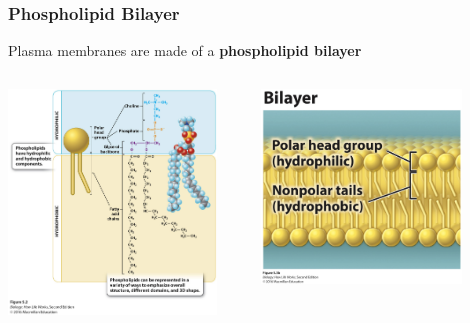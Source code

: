\documentclass[10pt]{beamer}
\begin{document}
\begin{frame}[t]
\frametitle{Phospholipid Bilayer}
\vspace{0.5cm}

	Plasma membranes are made of a \textbf{\textcolor{myblue}{phospholipid bilayer}}
	
	\vspace{1.0cm}
	
	\begin{columns}
		\begin{column}{0.5\textwidth}
			\centerline{\includegraphics[width=0.9\textwidth]{figures/figure_05_02.jpg}}
		\end{column}
		
		\begin{column}{0.5\textwidth}
			\centerline{\includegraphics[width=0.8\textwidth]{figures/figure_05_03b.jpg}}
		\end{column}
	\end{columns}	
\end{frame}
\end{document}
